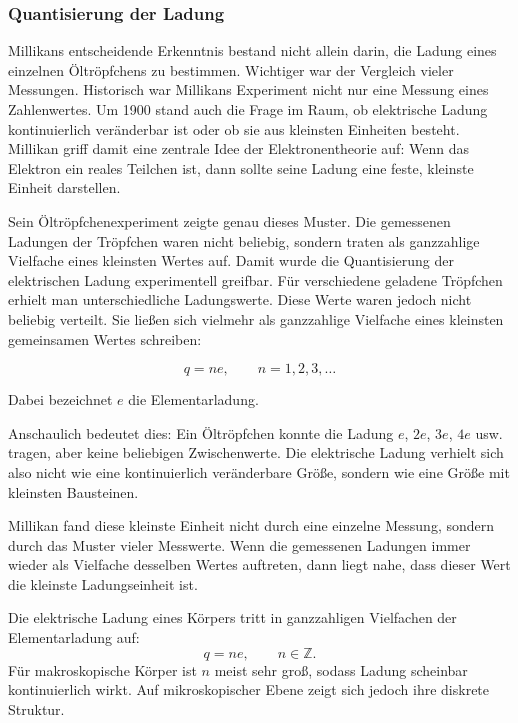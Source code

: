 \subsubsection{Quantisierung der Ladung}
\label{subsubsec:quantisierung-der-ladung}

Millikans entscheidende Erkenntnis bestand nicht allein darin,
die Ladung eines einzelnen Öltröpfchens zu bestimmen.
Wichtiger war der Vergleich vieler Messungen.
Historisch war Millikans Experiment nicht nur eine Messung eines Zahlenwertes.
Um 1900 stand auch die Frage im Raum,
ob elektrische Ladung kontinuierlich veränderbar ist
oder ob sie aus kleinsten Einheiten besteht.
Millikan griff damit eine zentrale Idee der Elektronentheorie auf:
Wenn das Elektron ein reales Teilchen ist,
dann sollte seine Ladung eine feste, kleinste Einheit darstellen.

Sein Öltröpfchenexperiment zeigte genau dieses Muster.
Die gemessenen Ladungen der Tröpfchen waren nicht beliebig,
sondern traten als ganzzahlige Vielfache eines kleinsten Wertes auf.
Damit wurde die Quantisierung der elektrischen Ladung experimentell greifbar.
Für verschiedene geladene Tröpfchen erhielt man unterschiedliche Ladungswerte.
Diese Werte waren jedoch nicht beliebig verteilt.
Sie ließen sich vielmehr als ganzzahlige Vielfache eines kleinsten gemeinsamen
Wertes schreiben:

\[
q = n e,
\qquad n = 1,2,3,\dots
\]

Dabei bezeichnet \(e\) die Elementarladung.

Anschaulich bedeutet dies:
Ein Öltröpfchen konnte die Ladung \(e\), \(2e\), \(3e\), \(4e\) usw. tragen,
aber keine beliebigen Zwischenwerte.
Die elektrische Ladung verhielt sich also nicht wie eine kontinuierlich
veränderbare Größe,
sondern wie eine Größe mit kleinsten Bausteinen.

Millikan fand diese kleinste Einheit nicht durch eine einzelne Messung,
sondern durch das Muster vieler Messwerte.
Wenn die gemessenen Ladungen immer wieder als Vielfache desselben Wertes
auftreten,
dann liegt nahe,
dass dieser Wert die kleinste Ladungseinheit ist.

\begin{MathBox}
	\label{box:ganzzahlige-vielfache-elementarladung}
	\small
	Die elektrische Ladung eines Körpers
	tritt in ganzzahligen Vielfachen der Elementarladung auf:
	\[
	q = n e,
	\qquad n \in \mathbb{Z}.
	\]
	Für makroskopische Körper ist \(n\) meist sehr groß,
	sodass Ladung scheinbar kontinuierlich wirkt.
	Auf mikroskopischer Ebene zeigt sich jedoch ihre diskrete Struktur.
\end{MathBox}

